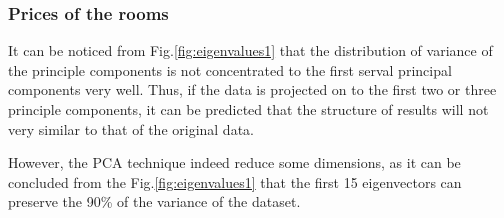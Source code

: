\documentclass[12pt]{article}
\begin{document}
\subsubsection{Prices of the rooms}

It can be noticed from Fig.\ref{fig:eigenvalues1} that the distribution of variance of the principle components is not concentrated to the first serval principal components very well. Thus, if the data is projected on to the first two or three principle components, it can be predicted that the structure of results will not very similar to that of the original data.\par
However, the PCA technique indeed reduce some dimensions, as it can be concluded from the Fig.\ref{fig:eigenvalues1} that the first 15 eigenvectors can preserve the 90\% of the variance of the dataset. 
\end{document}
